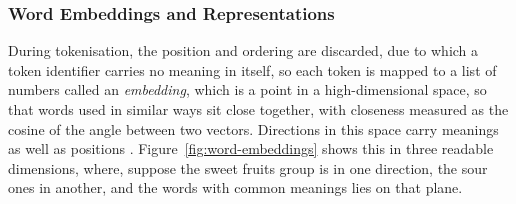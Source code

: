 \subsubsection{Word Embeddings and Representations}
\label{subsec:word-embeddings}

During tokenisation, the position and ordering are discarded, due to which a token identifier carries no meaning in itself, so each token is mapped to a list of numbers called an \emph{embedding}, which is a point in a high-dimensional space, so that words used in similar ways sit close together, with closeness measured as the cosine of the angle between two vectors. Directions in this space carry meanings as well as positions \cite{mikolov2013efficientestimationwordrepresentations}. Figure~\ref{fig:word-embeddings} shows this in three readable dimensions, where, suppose the sweet fruits group is in one direction, the sour ones in another, and the words with common meanings lies on that plane.

